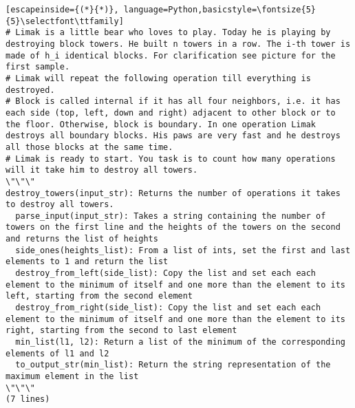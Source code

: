 \begin{figure*}[h]
\begin{lstlisting}[escapeinside={(*}{*)}, language=Python,basicstyle=\fontsize{5}{5}\selectfont\ttfamily]
# Limak is a little bear who loves to play. Today he is playing by destroying block towers. He built n towers in a row. The i-th tower is made of h_i identical blocks. For clarification see picture for the first sample.
# Limak will repeat the following operation till everything is destroyed.
# Block is called internal if it has all four neighbors, i.e. it has each side (top, left, down and right) adjacent to other block or to the floor. Otherwise, block is boundary. In one operation Limak destroys all boundary blocks. His paws are very fast and he destroys all those blocks at the same time.
# Limak is ready to start. You task is to count how many operations will it take him to destroy all towers.
\"\"\"
destroy_towers(input_str): Returns the number of operations it takes to destroy all towers.
  parse_input(input_str): Takes a string containing the number of towers on the first line and the heights of the towers on the second and returns the list of heights
  side_ones(heights_list): From a list of ints, set the first and last elements to 1 and return the list
  destroy_from_left(side_list): Copy the list and set each each element to the minimum of itself and one more than the element to its left, starting from the second element
  destroy_from_right(side_list): Copy the list and set each each element to the minimum of itself and one more than the element to its right, starting from the second to last element
  min_list(l1, l2): Return a list of the minimum of the corresponding elements of l1 and l2
  to_output_str(min_list): Return the string representation of the maximum element in the list
\"\"\"
(7 lines)


\end{lstlisting}
\end{figure*}
